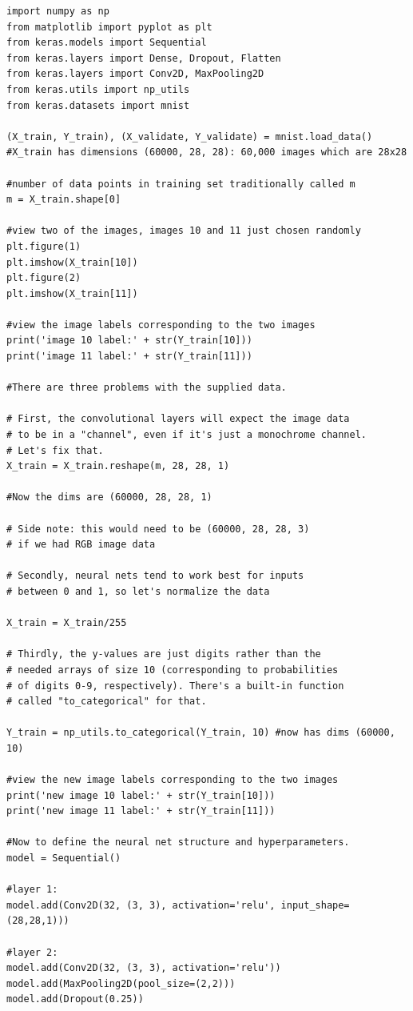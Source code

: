 \documentclass{book}
\theoremstyle{plain}
\theoremstyle{definition}
\numberwithin{exm}{chapter}
\theoremstyle{remark}
\theoremstyle{summary}
\theoremstyle{overview}
\begin{document}
\begin{lstlisting}
import numpy as np
from matplotlib import pyplot as plt
from keras.models import Sequential
from keras.layers import Dense, Dropout, Flatten
from keras.layers import Conv2D, MaxPooling2D
from keras.utils import np_utils
from keras.datasets import mnist

(X_train, Y_train), (X_validate, Y_validate) = mnist.load_data()
#X_train has dimensions (60000, 28, 28): 60,000 images which are 28x28

#number of data points in training set traditionally called m
m = X_train.shape[0]

#view two of the images, images 10 and 11 just chosen randomly
plt.figure(1)
plt.imshow(X_train[10])
plt.figure(2)
plt.imshow(X_train[11])

#view the image labels corresponding to the two images
print('image 10 label:' + str(Y_train[10]))
print('image 11 label:' + str(Y_train[11]))

#There are three problems with the supplied data.

# First, the convolutional layers will expect the image data
# to be in a "channel", even if it's just a monochrome channel.
# Let's fix that.
X_train = X_train.reshape(m, 28, 28, 1)

#Now the dims are (60000, 28, 28, 1)

# Side note: this would need to be (60000, 28, 28, 3)
# if we had RGB image data

# Secondly, neural nets tend to work best for inputs
# between 0 and 1, so let's normalize the data

X_train = X_train/255

# Thirdly, the y-values are just digits rather than the
# needed arrays of size 10 (corresponding to probabilities
# of digits 0-9, respectively). There's a built-in function
# called "to_categorical" for that.

Y_train = np_utils.to_categorical(Y_train, 10) #now has dims (60000, 10)

#view the new image labels corresponding to the two images
print('new image 10 label:' + str(Y_train[10]))
print('new image 11 label:' + str(Y_train[11]))

#Now to define the neural net structure and hyperparameters.
model = Sequential()

#layer 1:
model.add(Conv2D(32, (3, 3), activation='relu', input_shape=(28,28,1)))

#layer 2:
model.add(Conv2D(32, (3, 3), activation='relu'))
model.add(MaxPooling2D(pool_size=(2,2)))
model.add(Dropout(0.25))


\end{lstlisting}
\end{document}
